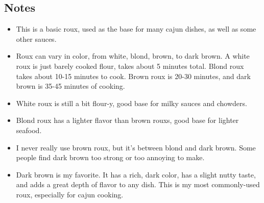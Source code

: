 \begin{multicols}{2}
\subsection*{Notes}
\begin{itemize}
    \item This is a basic roux, used as the base for many cajun dishes, as well as some other sauces.
    \item Roux can vary in color, from white, blond, brown, to dark brown. A white roux is just barely cooked flour, takes about 5 minutes total. Blond roux takes about 10-15 minutes to cook. Brown roux is 20-30 minutes, and dark brown is 35-45 minutes of cooking.
    \item White roux is still a bit flour-y, good base for milky sauces and chowders.
    \item Blond roux has a lighter flavor than brown rouxs, good base for lighter seafood.
    \item I never really use brown roux, but it's between blond and dark brown. Some people find dark brown too strong or too annoying to make.
    \item Dark brown is my favorite. It has a rich, dark color, has a slight nutty taste, and adds a great depth of flavor to any dish. This is my most commonly-used roux, especially for cajun cooking.
\end{itemize}
\end{multicols}
\clearpage